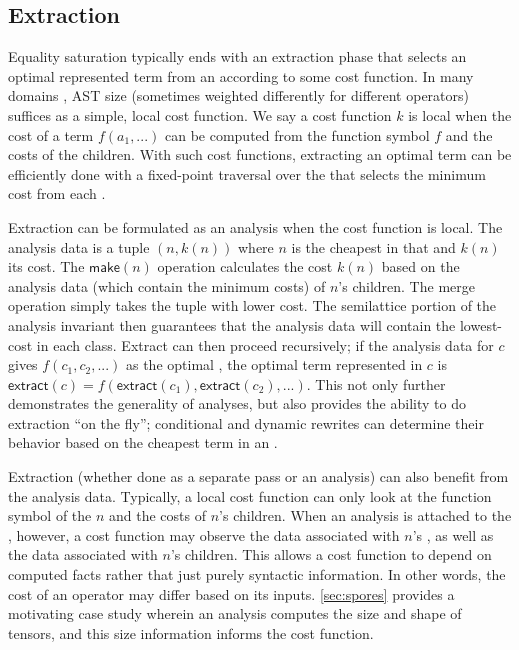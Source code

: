 \subsection{Extraction}
\label{sec:tricks-extraction}

Equality saturation typically ends with an extraction phase that selects an
  optimal represented term from an \eclass according to some cost function.
In many domains \cite{herbie, szalinski}, AST size
  (sometimes weighted differently for different operators) suffices as a simple,
  local cost function.
We say a cost function $k$ is local when the cost of a term $f(a_{1}, ...)$ can be
  computed from the function symbol $f$ and the costs of the children.
With such cost functions, extracting an optimal term can be efficiently done
  with a fixed-point traversal over the \egraph that selects the minimum cost
  \enode from each \eclass \cite{herbie}.

Extraction can be formulated as an \eclass analysis when the cost function
  is local.
The analysis data is a tuple $(n, k(n))$ where $n$ is the cheapest \enode
  in that \eclass and $k(n)$ its cost.
The $\textsf{make}(n)$ operation calculates the cost $k(n)$ based on
  the analysis data (which contain the minimum costs) of $n$'s children.
The \textsf{merge} operation simply takes the tuple with lower cost.
The semilattice portion of the analysis invariant then guarantees that the
  analysis data will contain the lowest-cost \enode in each class.
Extract can then proceed recursively;
  if the analysis data for \eclass $c$ gives $f(c_{1}, c_{2}, ...)$ as the optimal \enode,
  the optimal term represented in $c$ is
  $\textsf{extract}(c) = f( \textsf{extract}(c_{1}), \textsf{extract}(c_{2}), ... )$.
This not only further demonstrates the generality of \eclass analyses, but also
  provides the ability to do extraction ``on the fly''; conditional and dynamic
  rewrites can determine their behavior based on the cheapest term in an \eclass.

Extraction (whether done as a separate pass or an \eclass analysis) can also
  benefit from the analysis data.
Typically, a local cost function can only look at the function symbol of the
  \enode $n$ and the costs of $n$'s children.
When an \eclass analysis is attached to the \egraph, however, a cost function
  may observe the data associated with $n$'s \eclass, as well as the data
  associated with $n$'s children.
This allows a cost function to depend on computed facts rather that just purely
  syntactic information.
In other words, the cost of an operator may differ based on its inputs.
\autoref{sec:spores} provides a motivating case study wherein an \eclass
  analysis computes the size and shape of tensors, and this size information
  informs the cost function.

